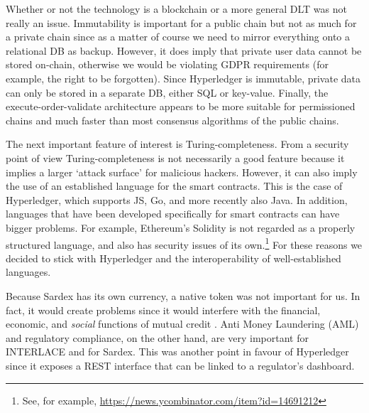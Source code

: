 Whether or not the technology is a blockchain or a more general DLT was not really an issue. Immutability is important for a public chain but not as much for a private chain since as a matter of course we need to mirror everything onto a relational DB as backup. However, it does imply that private user data cannot be stored on-chain, otherwise we would be violating GDPR requirements (for example, the right to be forgotten). Since Hyperledger is immutable, private data can only be stored in a separate DB, either SQL or key-value. Finally, the execute-order-validate architecture appears to be more suitable for permissioned chains and much faster than most consensus algorithms of the public chains.

The next important feature of interest is Turing-completeness. From a security point of view Turing-completeness is not necessarily a good feature because it implies a larger `attack surface' for malicious hackers. However, it can also imply the use of an established language for the smart contracts. This is the case of Hyperledger, which supports JS, Go, and more recently also Java. In addition, languages that have been developed specifically for smart contracts can have bigger problems. For example, Ethereum's Solidity is not regarded as a properly structured language, and also has security issues of its own.\footnote{See, for example, \url{https://news.ycombinator.com/item?id=14691212}} For these reasons we decided to stick with Hyperledger and the interoperability of well-established languages.

Because Sardex has its own currency, a native token was not important for us. In fact, it would create problems since it would interfere with the financial, economic, and \emph{social} functions of mutual credit \cite{SartoriDini2016}. Anti Money Laundering (AML) and regulatory compliance, on the other hand, are very important for INTERLACE and for Sardex. This was another point in favour of Hyperledger since it exposes a REST interface that can be linked to a regulator's dashboard.




